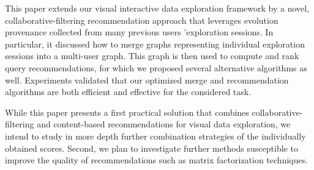 


This paper extends our visual interactive data exploration framework {\color{Fuchsia}\framework{}} by a novel, collaborative-filtering recommendation approach that leverages evolution provenance collected from many previous users 'exploration sessions. 
In particular, it discussed how to merge graphs representing individual exploration sessions into a multi-user graph. This graph is then used to compute and rank query recommendations, for which we proposed several alternative algorithms as well. Experiments validated that our optimized merge and recommendation algorithms are both efficient and effective for the considered task. 

While this paper presents a first practical solution that combines collaborative-filtering and content-based recommendations for visual data exploration, we intend to study in more depth further combination strategies of the individually obtained scores. Second, we plan to investigate further methods susceptible to improve the quality of recommendations such as matrix factorization techniques.






